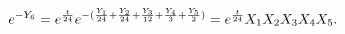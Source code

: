 \begin{equation}
e^{-Y_6}=e^{{t\over24}}e^{-({Y_1\over24}+{Y_2\over24}+{Y_3\over12}+{Y_4\over3}+{Y_5\over2})}
=e^{{t\over24}}X_1X_2X_3X_4X_5.
\end{equation}

